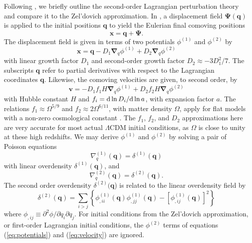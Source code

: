 Following \citet{2010MNRAS.403.1859J}, we briefly outline the second-order Lagrangian perturbation theory and compare it to the Zel'dovich approximation.  In \lpt, a displacement field $\boldsymbol{\Psi}(\boldsymbol{q})$ is applied to the initial positions $\boldsymbol{q}$ to yield the Eulerian final comoving positions
\begin{equation} \label{eq:displacement}
	\boldsymbol{x} = \boldsymbol{q} + \boldsymbol{\Psi}.
\end{equation}
The displacement field is given in terms of two potentials $\phi^{(1)}$ and $\phi^{(2)}$ by
\begin{equation} \label{eq:potentials}
	\boldsymbol{x} = \boldsymbol{q} - D_{1} \boldsymbol{\nabla}_{q} \phi^{(1)} + D_{2} \boldsymbol{\nabla}_{q} \phi^{(2)}
\end{equation}
with linear growth factor $D_{1}$ and second-order growth factor $D_{2} \approx -3 D_{1}^{2} / 7$.  The subscripts $\boldsymbol{q}$ refer to partial derivatives with respect to the Lagrangian coordinates $\boldsymbol{q}$.  Likewise, the comoving velocities are given, to second order, by
\begin{equation} \label{eq:velocity}
	\boldsymbol{v} =  - D_{1} f_{1} H \boldsymbol{\nabla}_{q} \phi^{(1)} + D_{2} f_{2} H \boldsymbol{\nabla}_{q} \phi^{(2)}
\end{equation}
with Hubble constant $H$ and $f_{i} = {\rm {d}}\, \mathrm{ln}\, D_{i} / {\rm {d}}\, \mathrm{ln}\, a$, with expansion factor $a$.  The relations $f_{1} \approx \Omega^{5/9}$ and $f_{2} \approx 2 \Omega^{6/11}$, with matter density $\Omega$, apply for flat models with a non-zero cosmological constant \citep{1995A&A...296..575B}.  The $f_{1}$, $f_{2}$, and $D_{2}$ approximations here are very accurate for most actual $\Lambda$CDM initial conditions, as $\Omega$ is close to unity at these high redshifts.  We may derive $\phi^{(1)}$ and $\phi^{(2)}$ by solving a pair of Poisson equations
\begin{equation} \label{eq:poisson1}
	\nabla_{q}^{(1)}(\boldsymbol{q}) = \delta^{(1)}(\boldsymbol{q})
\end{equation}
with linear overdensity $\delta^{(1)}(\boldsymbol{q})$, and
\begin{equation} \label{eq:poisson2}
	\nabla_{q}^{(2)}(\boldsymbol{q}) = \delta^{(2)}(\boldsymbol{q}).
\end{equation}
The second order overdensity $\delta^{(2)}(\boldsymbol{q}$) is related to the linear overdensity field by
\begin{equation} \label{eq:second-order_overdensity}
	\delta^{(2)}(\boldsymbol{q}) = \sum_{i > j} \left\{ \phi_{,ii}^{(1)}(\boldsymbol{q}) \phi_{,jj}^{(1)}(\boldsymbol{q}) - \left[ \phi_{,ij}^{(1)}(\boldsymbol{q}) \right]^{2} \right\}
\end{equation}
where $\phi_{,ij} \equiv \partial^{2} \phi / \partial q_{i} \partial q_{j}$.  For initial conditions from the Zel'dovich approximation, or first-order Lagrangian initial conditions, the $\phi^{(2)}$ terms of equations (\ref{eq:potentials}) and (\ref{eq:velocity}) are ignored.




